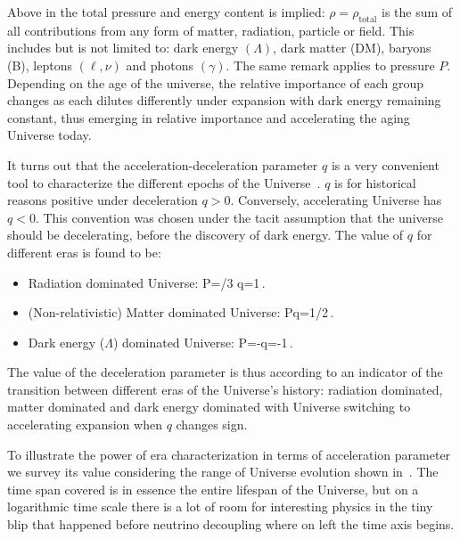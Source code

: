 Above in  the total pressure and energy content is implied: $\rho=\rho_\mathrm{total}$ is the sum of all contributions from any form of matter, radiation, particle  or field. This includes but is not limited to: dark energy $(\Lambda)$, dark matter (DM), baryons (B), leptons $(\ell,\nu)$ and photons $(\gamma)$. The same remark applies to pressure $P$. Depending on the age of the universe, the relative importance of each group changes as each dilutes differently under expansion with dark energy remaining constant, thus emerging in relative importance and accelerating the aging Universe today. 

It turns out that the acceleration-deceleration parameter $q$ is a very convenient tool to characterize the different epochs of the Universe~\cite{Rafelski:2013yka}. $q$ is for historical reasons positive under deceleration $q>0$. Conversely, accelerating Universe has $q<0$. This convention was chosen under the tacit assumption that the universe should be decelerating, before the discovery of dark energy. The value of $q$ for different eras is found to be:
\begin{itemize}
\item Radiation dominated Universe: 
P=\rho/3 \implies q=1\,.
\eeqn
\item (Non-relativistic) Matter dominated Universe: 
P\ll\rho \implies q=1/2\,.
\eeqn
\item Dark energy ($\Lambda$) dominated Universe: 
P=-\rho \implies q=-1\,.
\eeqn
\end{itemize}
The value of the deceleration parameter is thus according to  an indicator of the transition between different eras of the Universe's history: radiation dominated, matter dominated and dark energy dominated with Universe switching to accelerating expansion when $q$ changes sign.

To illustrate the power of era characterization in terms of acceleration parameter we survey its value considering the range of Universe evolution shown in~. The time span covered is in essence the entire lifespan of the Universe, but on a logarithmic time scale there is a lot of room for interesting physics in the tiny blip that happened before neutrino decoupling where on left the time axis begins. 

